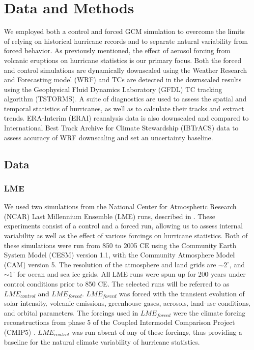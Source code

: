\documentclass[smallextended]{svjour3}       %
\begin{document}
\section{Data and Methods}
\label{methods}
We employed both a control and forced GCM simulation to overcome the limits of relying on historical hurricane records and to separate natural variability from forced behavior. As previously mentioned, the effect of aerosol forcing from volcanic eruptions on hurricane statistics is our primary focus. Both the forced and control simulations are dynamically downscaled using the Weather Research and Forecasting model (WRF) \cite{wrf_tech} and TCs are detected in the downscaled results using the Geophysical Fluid Dynamics Laboratory (GFDL) TC tracking algorithm (TSTORMS). A suite of diagnostics are used to assess the spatial and temporal statistics of hurricanes, as well as to calculate their tracks and extract trends. ERA-Interim (ERAI) reanalysis data is also downscaled and compared to International Best Track Archive for Climate Stewardship (IBTrACS) data to assess accuracy of WRF downscaling and set an uncertainty baseline.
\subsection{Data}
\subsubsection{LME}
We used two simulations from the National Center for Atmospheric Research (NCAR) Last Millennium Ensemble (LME) runs, described in \cite{gcm_lme}. These experiments consist of a control and a forced run, allowing us to assess internal variability as well as the effect of various forcings on hurricane statistics. Both of these simulations were run from 850 to 2005 CE using the Community Earth System Model (CESM) version 1.1, with the Community Atmosphere Model (CAM) version 5. The resolution of the atmosphere and land grids are ${\sim}2^\circ$, and ${\sim}1^\circ$ for ocean and sea ice grids. All LME runs were spun up for 200 years under control conditions prior to 850 CE. The selected runs will be referred to as $LME_{control}$ and $LME_{forced}$. $LME_{forced}$ was forced with the transient evolution of solar intensity, volcanic emissions, greenhouse gases, aerosols, land-use conditions, and orbital parameters. The forcings used in $LME_{forced}$ were the climate forcing reconstructions from phase 5 of the Coupled Intermodel Comparison Project (CMIP5) \cite{gmd-4-33-2011}. $LME_{control}$ was run absent of any of these forcings, thus providing a baseline for the natural climate variability of hurricane statistics. 
\end{document}
